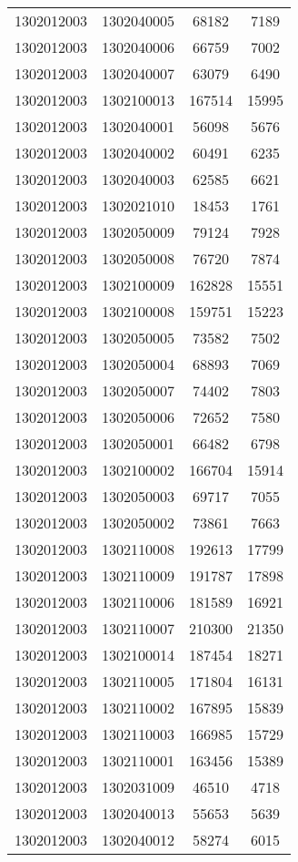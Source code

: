 \begin{longtable}{llcc}
1302012003 & 1302040005 & 68182 & 7189\\
1302012003 & 1302040006 & 66759 & 7002\\
1302012003 & 1302040007 & 63079 & 6490\\
1302012003 & 1302100013 & 167514 & 15995\\
1302012003 & 1302040001 & 56098 & 5676\\
1302012003 & 1302040002 & 60491 & 6235\\
1302012003 & 1302040003 & 62585 & 6621\\
1302012003 & 1302021010 & 18453 & 1761\\
1302012003 & 1302050009 & 79124 & 7928\\
1302012003 & 1302050008 & 76720 & 7874\\
1302012003 & 1302100009 & 162828 & 15551\\
1302012003 & 1302100008 & 159751 & 15223\\
1302012003 & 1302050005 & 73582 & 7502\\
1302012003 & 1302050004 & 68893 & 7069\\
1302012003 & 1302050007 & 74402 & 7803\\
1302012003 & 1302050006 & 72652 & 7580\\
1302012003 & 1302050001 & 66482 & 6798\\
1302012003 & 1302100002 & 166704 & 15914\\
1302012003 & 1302050003 & 69717 & 7055\\
1302012003 & 1302050002 & 73861 & 7663\\
1302012003 & 1302110008 & 192613 & 17799\\
1302012003 & 1302110009 & 191787 & 17898\\
1302012003 & 1302110006 & 181589 & 16921\\
1302012003 & 1302110007 & 210300 & 21350\\
1302012003 & 1302100014 & 187454 & 18271\\
1302012003 & 1302110005 & 171804 & 16131\\
1302012003 & 1302110002 & 167895 & 15839\\
1302012003 & 1302110003 & 166985 & 15729\\
1302012003 & 1302110001 & 163456 & 15389\\
1302012003 & 1302031009 & 46510 & 4718\\
1302012003 & 1302040013 & 55653 & 5639\\
1302012003 & 1302040012 & 58274 & 6015\\

\end{longtable}
